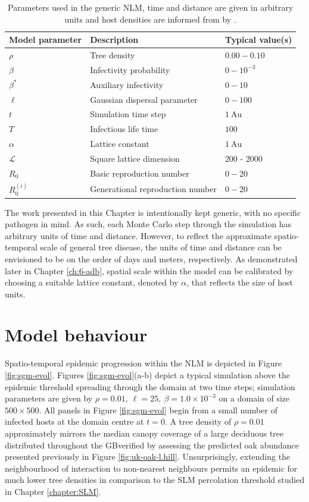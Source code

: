 \begin{table}
\centering
\begin{tabular}{l l l}
\hline
\textbf{Model parameter} & \textbf{Description} & \textbf{Typical value(s)}\\
\hline
$\rho$  & Tree density & $0.00 - 0.10$ \\ 
$\beta$ & Infectivity probability & $0 - 10^{-3}$ \\
$\beta^*$ & Auxiliary infectivity & $0 - 10$ \\
$\ell$ & Gaussian dispersal parameter & $ 0 - 100$ \\
$t$ & Simulation time step & $1\ \mathrm{Au}$\\
$T$ & Infectious life time & $100$  \\
$\alpha$ & Lattice constant & $1\ \mathrm{Au}$ \\
$\mathcal{L}$ & Square lattice dimension & $200$ - $2000$ \\
$R_0$ & Basic reproduction number & $0-20$ \\
$R_0^{(i)}$ & Generational reproduction number & $0-20$ \\
\hline
\end{tabular}
\caption{Parameters used in the generic NLM, time and distance are given in arbitrary units and host densities are informed from by \cite{hill.data}.}
\label{tab:SIR-model}
\end{table}

The work presented in this Chapter is intentionally kept generic, with no specific pathogen in mind.
As such, each Monte Carlo step through the simulation has arbitrary units of time and distance.
However, to reflect the approximate spatio-temporal scale of general tree disease, the units of time and distance can be envisioned to be on the order of days and meters, respectively.
As demonstrated later in Chapter \ref{ch:6-adb}, spatial scale within the model can be calibrated by choosing a suitable lattice constant, denoted by $\alpha$, that reflects the size of host units.

\section{Model behaviour}

Spatio-temporal epidemic progression within the NLM is depicted in Figure \ref{fig:sgm-evol}.
Figures \ref{fig:sgm-evol}(a-b) depict a typical simulation above the epidemic threshold spreading through the domain at two time steps;
simulation parameters are given by $\rho=0.01,\ \ell = 25,\ \beta = 1.0 \times 10^{-3}$ on a domain of size $500 \times 500$.
All panels in Figure \ref{fig:sgm-evol} begin from a small number of infected hosts at the domain centre at $t=0$.
A tree density of $\rho = 0.01$ approximately mirrors the median canopy coverage of a large deciduous tree distributed throughout the GB\textemdash verified by assessing the predicted oak abundance presented previously in Figure \ref{fig:uk-oak-l.hill}.
Unsurprisingly, extending the neighbourhood of interaction to non-nearest neighbours permits an epidemic for much lower tree densities in comparison to the SLM percolation threshold studied in Chapter \ref{chapter:SLM}.

